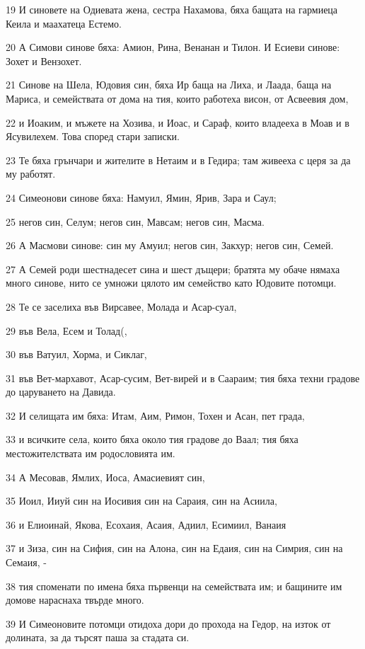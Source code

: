 \par 19 И синовете на Одиевата жена, сестра Нахамова, бяха бащата на гармиеца Кеила и маахатеца Естемо.
\par 20 А Симови синове бяха: Амион, Рина, Венанан и Тилон. И Есиеви синове: Зохет и Вензохет.
\par 21 Синове на Шела, Юдовия син, бяха Ир баща на Лиха, и Лаада, баща на Мариса, и семействата от дома на тия, които работеха висон, от Асвеевия дом,
\par 22 и Иоаким, и мъжете на Хозива, и Иоас, и Сараф, които владееха в Моав и в Ясувилехем. Това според стари записки.
\par 23 Те бяха грънчари и жителите в Нетаим и в Гедира; там живееха с церя за да му работят.
\par 24 Симеонови синове бяха: Намуил, Ямин, Ярив, Зара и Саул;
\par 25 негов син, Селум; негов син, Мавсам; негов син, Масма.
\par 26 А Масмови синове: син му Амуил; негов син, Закхур; негов син, Семей.
\par 27 А Семей роди шестнадесет сина и шест дъщери; братята му обаче нямаха много синове, нито се умножи цялото им семейство като Юдовите потомци.
\par 28 Те се заселиха във Вирсавее, Молада и Асар-суал,
\par 29 във Вела, Есем и Толад(,
\par 30 във Ватуил, Хорма, и Сиклаг,
\par 31 във Вет-мархавот, Асар-сусим, Вет-вирей и в Саараим; тия бяха техни градове до царуването на Давида.
\par 32 И селищата им бяха: Итам, Аим, Римон, Тохен и Асан, пет града,
\par 33 и всичките села, които бяха около тия градове до Ваал; тия бяха местожителствата им родословията им.
\par 34 А Месовав, Ямлих, Иоса, Амасиевият син,
\par 35 Иоил, Ииуй син на Иосивия син на Сараия, син на Асиила,
\par 36 и Елиоинай, Якова, Есохаия, Асаия, Адиил, Есимиил, Ванаия
\par 37 и Зиза, син на Сифия, син на Алона, син на Едаия, син на Симрия, син на Семаия, -
\par 38 тия споменати по имена бяха първенци на семействата им; и бащините им домове нараснаха твърде много.
\par 39 И Симеоновите потомци отидоха дори до прохода на Гедор, на изток от долината, за да търсят паша за стадата си.

